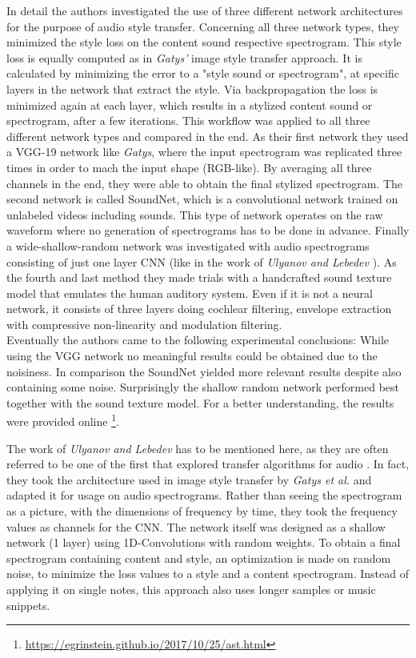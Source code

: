 In detail the authors investigated the use of three different network architectures for the purpose of audio style transfer. Concerning all three network types, they minimized the style loss on the content sound respective spectrogram. This style loss is equally computed as in \textit{Gatys'} image style transfer approach. It is calculated by minimizing the error to a "style sound or spectrogram", at specific layers in the network that extract the style. Via backpropagation the loss is minimized again at each layer, which results in a stylized content sound or spectrogram, after a few iterations. This workflow was applied to all three different network types and compared in the end. As their first network they used a VGG-19 network like \textit{Gatys}, where the input spectrogram was replicated three times in order to mach the input shape (RGB-like). By averaging all three channels in the end, they were able to obtain the final stylized spectrogram. The second network is called SoundNet, which is a convolutional network trained on unlabeled videos including sounds. This type of network operates on the raw waveform where no generation of spectrograms has to be done in advance. Finally a wide-shallow-random network was investigated with audio spectrograms consisting of just one layer CNN (like in the work of \textit{Ulyanov and Lebedev} \cite{ulyanov2016audio}). As the fourth and last method they made trials with a handcrafted sound texture model that emulates the human auditory system. Even if it is not a neural network, it consists of three layers doing cochlear filtering, envelope extraction with compressive non-linearity and modulation filtering.\\
Eventually the authors came to the following experimental conclusions: While using the VGG network no meaningful results could be obtained due to the noisiness. In comparison the SoundNet yielded more relevant results despite also containing some noise. Surprisingly the shallow random network performed best together with the sound texture model. For a better understanding, the results were provided online \footnote{\url{https://egrinstein.github.io/2017/10/25/ast.html}}.

The work of \textit{Ulyanov and Lebedev} has to be mentioned here, as they are often referred to be one of the first that explored transfer algorithms for audio  \cite{ulyanov2016audio}. In fact, they took the architecture used in image style transfer by \textit{Gatys et al.} and adapted it for usage on audio spectrograms. Rather than seeing the spectrogram as a picture, with the dimensions of frequency by time, they took the frequency values as channels for the CNN. The network itself was designed as a shallow network (1 layer) using 1D-Convolutions with random weights. To obtain a final spectrogram containing content and style, an optimization is made on random noise, to minimize the loss values to a style and a content spectrogram. Instead of applying it on single notes, this approach also uses longer samples or music snippets. 

